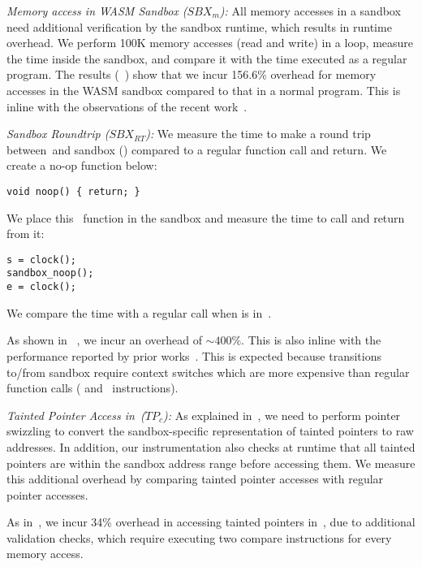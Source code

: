 \noindent\emph{Memory access in WASM Sandbox ($SBX_{m}$):} 
All memory accesses in a sandbox need additional verification by the sandbox runtime, which results in runtime overhead.
We perform 100K memory accesses (read and write) in a loop, measure the time inside the sandbox, and compare it with the time executed as a regular program.
%
The results (~) show that we incur 156.6\% overhead for memory accesses in the WASM sandbox compared to that in a normal program.
This is inline with the observations of the recent work~\cite{jangda2019not}.

\noindent\emph{Sandbox Roundtrip ($SBX_{RT}$):}
We measure the time to make a round trip between~\cregion and sandbox (\ucregion) compared to a regular function call and return.
We create a no-op function below:
\begin{verbatim}
void noop() { return; }
\end{verbatim}
We place this~ function in the sandbox and measure the time to call and return from it:
\begin{verbatim}
s = clock();
sandbox_noop();
e = clock();
\end{verbatim}
We compare the time with a regular call when  is in~\cregion.

As shown in ~, we incur an overhead of $\sim 400\%$. This is also inline with the performance reported by prior works~\cite{jangda2019not, rlbox-paper}.
This is expected because transitions to/from sandbox require context switches which are more expensive than regular function calls (\ie{} and~ instructions).

\noindent\emph{Tainted Pointer Access in~\cregion ($TP_{c}$):}
As explained in~, we need to perform pointer swizzling to convert the sandbox-specific representation of tainted pointers to raw addresses.
In addition, our instrumentation also checks at runtime that all tainted pointers are within the sandbox address range before accessing them.
We measure this additional overhead by comparing tainted pointer accesses with regular pointer accesses.

As in~, we incur 34\% overhead in accessing tainted pointers in~\cregion,
 due to additional validation checks, which require executing two compare instructions for every memory access.


